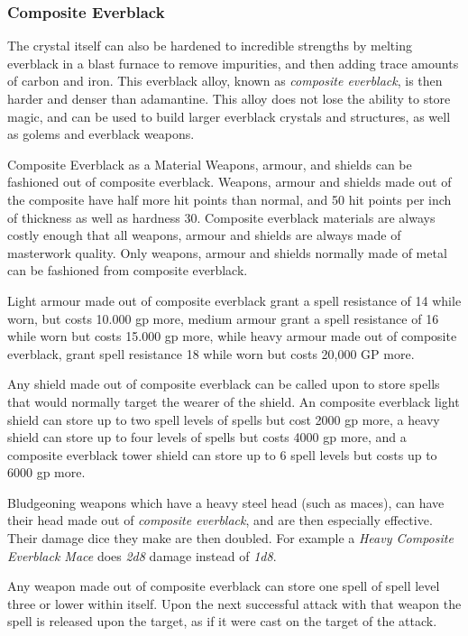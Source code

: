 \subsubsection{Composite Everblack}
\label{sec:Composite Everblack}

The crystal itself can also be hardened to incredible strengths by melting
everblack in a blast furnace to remove impurities, and then adding trace
amounts of carbon and iron. This everblack alloy, known as \emph{composite
everblack}, is then harder and denser than adamantine. This alloy does not lose
the ability to store magic, and can be used to build larger everblack crystals
and structures, as well as golems and everblack weapons.

\begin{35e}{Composite Everblack as a Material}
  Weapons, armour, and shields can be fashioned out of composite everblack.
  Weapons, armour and shields made out of the composite have half more hit
  points than normal, and 50 hit points per inch of thickness as well as
  hardness 30. Composite everblack materials are always costly enough that all
  weapons, armour and shields are always made of masterwork quality.  Only
  weapons, armour and shields normally made of metal can be fashioned from
  composite everblack.

  Light armour made out of composite everblack grant a spell resistance of 14
  while worn, but costs 10.000 gp more, medium armour grant a spell resistance
  of 16 while worn but costs 15.000 gp more, while heavy armour made out of
  composite everblack, grant spell resistance 18 while worn but costs 20,000
  GP more.

  Any shield made out of composite everblack can be called upon to store
  spells that would normally target the wearer of the shield. An composite
  everblack light shield can store up to two spell levels of spells but cost
  2000 gp more, a heavy shield can store up to four levels of spells but costs
  4000 gp more, and a composite everblack tower shield can store up to 6 spell
  levels but costs up to 6000 gp more.

  Bludgeoning weapons which have a heavy steel head (such as maces), can have
  their head made out of \emph{composite everblack}, and are then especially
  effective. Their damage dice they make are then doubled. For example a
  \emph{Heavy Composite Everblack Mace} does \emph{2d8} damage instead of
  \emph{1d8}.

  Any weapon made out of composite everblack can store one spell of spell
  level three or lower within itself. Upon the next successful attack with
  that weapon the spell is released upon the target, as if it were cast on
  the target of the attack.
\end{35e}

